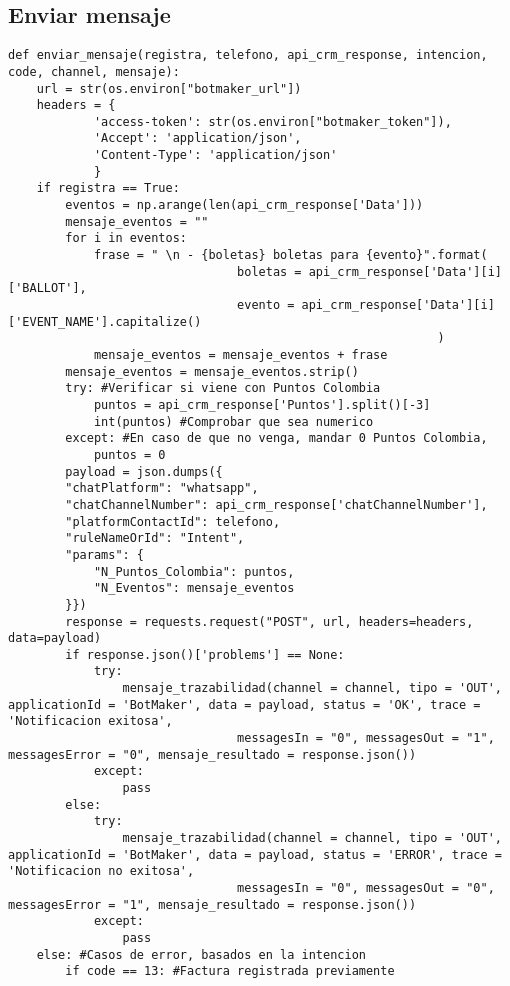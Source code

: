 \documentclass{article}
\begin{document}
\subsection{Enviar mensaje}
\begin{lstlisting}
def enviar_mensaje(registra, telefono, api_crm_response, intencion, code, channel, mensaje):
    url = str(os.environ["botmaker_url"])
    headers = {
            'access-token': str(os.environ["botmaker_token"]),
            'Accept': 'application/json',
            'Content-Type': 'application/json'
            }
    if registra == True:
        eventos = np.arange(len(api_crm_response['Data']))
        mensaje_eventos = ""
        for i in eventos: 
            frase = " \n - {boletas} boletas para {evento}".format(
                                boletas = api_crm_response['Data'][i]['BALLOT'],
                                evento = api_crm_response['Data'][i]['EVENT_NAME'].capitalize()
                                                            )
            mensaje_eventos = mensaje_eventos + frase
        mensaje_eventos = mensaje_eventos.strip()
        try: #Verificar si viene con Puntos Colombia
            puntos = api_crm_response['Puntos'].split()[-3]
            int(puntos) #Comprobar que sea numerico
        except: #En caso de que no venga, mandar 0 Puntos Colombia,
            puntos = 0
        payload = json.dumps({
        "chatPlatform": "whatsapp",
        "chatChannelNumber": api_crm_response['chatChannelNumber'],
        "platformContactId": telefono,
        "ruleNameOrId": "Intent",
        "params": {
            "N_Puntos_Colombia": puntos,
            "N_Eventos": mensaje_eventos
        }})
        response = requests.request("POST", url, headers=headers, data=payload)
        if response.json()['problems'] == None:
            try: 
                mensaje_trazabilidad(channel = channel, tipo = 'OUT', applicationId = 'BotMaker', data = payload, status = 'OK', trace = 'Notificacion exitosa',
                                messagesIn = "0", messagesOut = "1", messagesError = "0", mensaje_resultado = response.json())
            except:
                pass
        else:
            try: 
                mensaje_trazabilidad(channel = channel, tipo = 'OUT', applicationId = 'BotMaker', data = payload, status = 'ERROR', trace = 'Notificacion no exitosa',
                                messagesIn = "0", messagesOut = "0", messagesError = "1", mensaje_resultado = response.json())
            except:
                pass
    else: #Casos de error, basados en la intencion
        if code == 13: #Factura registrada previamente

\end{lstlisting}
\end{document}
